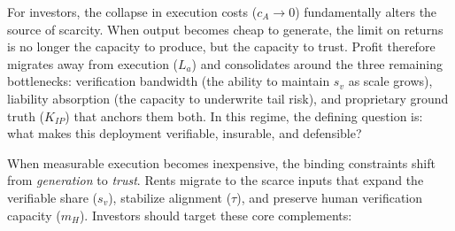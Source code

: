 \documentclass[12pt, letter]{article}
\begin{document}
For investors, the collapse in execution costs ($c_A \to 0$) fundamentally alters the source of scarcity. When output becomes cheap to generate, the limit on returns is no longer the capacity to produce, but the capacity to trust. Profit therefore migrates away from execution ($L_a$) and consolidates around the three remaining bottlenecks: verification bandwidth (the ability to maintain $s_v$ as scale grows), liability absorption (the capacity to underwrite tail risk), and proprietary ground truth ($K_{IP}$) that anchors them both. In this regime, the defining question is: what makes this deployment verifiable, insurable, and defensible?

When measurable execution becomes inexpensive, the binding constraints shift from \emph{generation} to \emph{trust}. Rents migrate to the scarce inputs that expand the verifiable share ($s_v$), stabilize alignment ($\tau$), and preserve human verification capacity ($m_H$). Investors should target these core complements:
\end{document}
